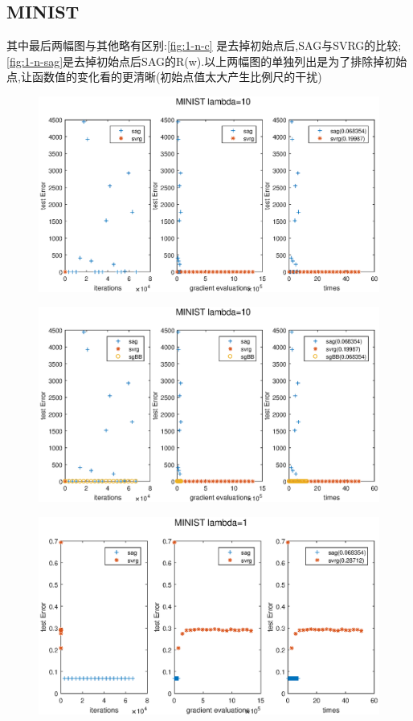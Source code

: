 \documentclass[UTF8]{ctexart}
\begin{document}
\subsection{MINIST}
其中最后两幅图与其他略有区别:\ref{fig:1-n-c} 是去掉初始点后,SAG与SVRG的比较;\ref{fig:1-n-sag}是去掉初始点后SAG的R(w).以上两幅图的单独列出是为了排除掉初始点,让函数值的变化看的更清晰(初始点值太大产生比例尺的干扰)
\begin{figure}[htbp]
\centering\includegraphics[width=5in]{1-10-a.eps}
\label{fig:1-10-a}
\end{figure}
\begin{figure}[htbp]
\centering\includegraphics[width=5in]{1-10-b.eps}
\label{fig:1-10-b}
\end{figure}

\begin{figure}[htbp]
\centering\includegraphics[width=5in]{1-1-a.eps}
\label{fig:1-1-a}
\end{figure}
\end{document}
